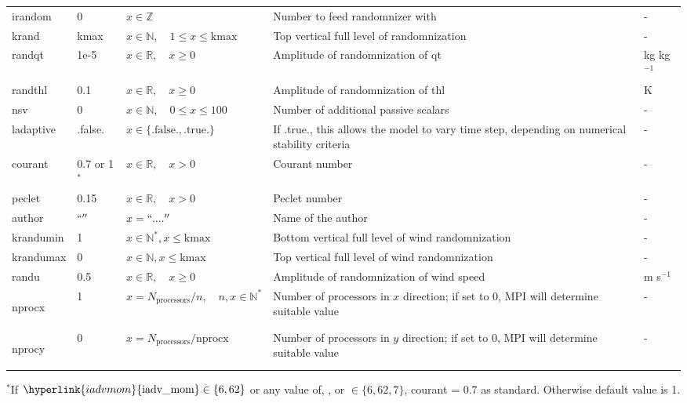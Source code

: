 \documentclass[twoside,11pt,fleqn,a4paper,english,openright]{report}
\begin{document}
\begin{center}
\begin{supertabular}{|l|p{1.6cm}|p{4.4cm}|p{6cm}|l|}
  irandom	& 0		& $x \in \mathbb{Z}$			& Number to feed randomnizer with		& -\\
  krand		& kmax		& $x \in \mathbb{N}, \quad 1 \leq x \leq \text{kmax}$		& Top vertical full level of randomnization 	& -\\
  randqt	& 1e-5		& $x \in \mathbb{R}, \quad x\geq 0$		& Amplitude of randomnization of qt		& kg kg$^{-1}$\\
  randthl	& 0.1		& $x \in \mathbb{R}, \quad x \geq 0$		& Amplitude of randomnization of thl		& K\\
  nsv		& 0		& $x \in \mathbb{N}, \quad 0 \leq x \leq 100$	& Number of additional passive scalars		& -\\
  ladaptive	& .false.	& $x\in\{\text{.false.},\text{.true.}\}$		& If .true., this allows the model to vary time step, depending on numerical stability criteria				& -\\
  courant	& 0.7 or 1$^*$	& $x \in \mathbb{R}, \quad x>0$		& Courant number				& -\\
  peclet	& 0.15 & $x \in \mathbb{R}, \quad x>0$		& Peclet number					& -\\	
  author	& $``''$	& $x = ``....''$	& Name of the author & -\\
  krandumin	& 1		& $x \in \mathbb{N}^*, x \leq \text{kmax}$	& Bottom vertical full level of wind randomnization 	& -\\
  krandumax	& 0		& $x \in \mathbb{N},  x \leq \text{kmax}$	& Top vertical full level of wind randomnization 	& -\\
  randu		& 0.5		& $x \in \mathbb{R}, \quad x \geq 0$		& Amplitude of randomnization of wind speed 	& m s$^{-1}$\\
  \hypertarget{nprocx}{nprocx}	& 1	& $x = N_{\text{processors}} / n, \quad n,x \in \mathbb{N}^*$	& Number of processors in $x$ direction; if set to 0, MPI will determine suitable value	& - \\
  \hypertarget{nprocy}{nprocy}	& 0	& $x = N_{\text{processors}} / \text{nprocx}$	& Number of processors in $y$ direction; if set to 0, MPI will determine suitable value	& - \\
\end{supertabular}
$^*$If $\hyperlink{iadvmom}{\text{iadv\_mom}} \in \lbrace6, 62\rbrace$ or any value of\hyperlink{iadvtke}{}, \hyperlink{iadvthl}{}, \hyperlink{iadvqt}{} or \hyperlink{iadvsv}{} $\in \lbrace6, 62, 7\rbrace$, courant = 0.7 as standard. Otherwise default value is 1.
\end{center}
\end{document}
